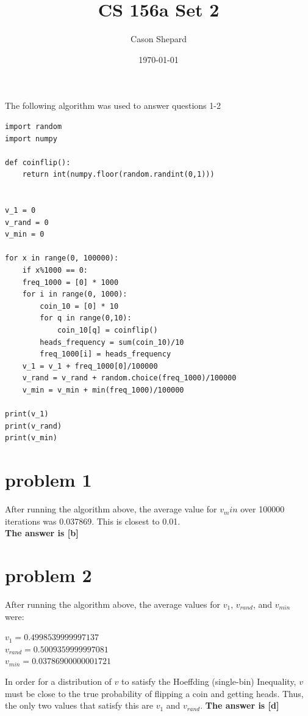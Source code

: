 \documentclass{article}
\title{CS 156a Set 2}
\author{Cason Shepard}
\date\today
\begin{document}
\maketitle
{\Large The following algorithm was used to answer questions 1-2}
\begin{verbatim}
import random
import numpy

def coinflip():
    return int(numpy.floor(random.randint(0,1)))


v_1 = 0
v_rand = 0
v_min = 0

for x in range(0, 100000):
    if x%1000 == 0:
    freq_1000 = [0] * 1000
    for i in range(0, 1000):
        coin_10 = [0] * 10
        for q in range(0,10):
            coin_10[q] = coinflip()
        heads_frequency = sum(coin_10)/10
        freq_1000[i] = heads_frequency
    v_1 = v_1 + freq_1000[0]/100000
    v_rand = v_rand + random.choice(freq_1000)/100000
    v_min = v_min + min(freq_1000)/100000

print(v_1)
print(v_rand)
print(v_min)
\end{verbatim}

\section*{problem 1}
After running the algorithm above, the average value for $v_min$ over 100000 iterations was 0.037869. This is closest to 0.01.\\
\newline
\textbf{The answer is [b]}

\section*{problem 2}
After running the algorithm above, the average values for $v_1$, $v_{rand}$, and $v_{min}$ were:
\begin{center}
$v_1 = 0.4998539999997137$\\
$v_{rand} = 0.5009359999997081$\\
$v_{min} = 0.03786900000001721$    
\end{center}
In order for a distribution of $v$ to satisfy the Hoeffding (single-bin) Inequality, $v$ must be close to the true probability of flipping a coin and getting heads. Thus, the only two values that satisfy this are $v_1$ and $v_{rand}$.
\newline\newline
\textbf{The answer is [d]}
\end{document}
